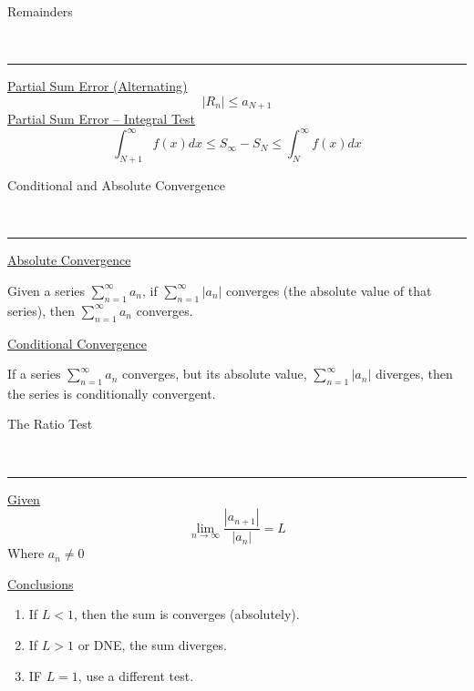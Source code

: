 \documentclass{article}
\begin{document}
\begin{large}
    Remainders
\end{large}\\
\noindent\rule{\textwidth}{0.5pt}

\begin{center}
\begin{multicols}{2}\noindent
    \underline{Partial Sum Error (Alternating)}
    \[
        |R_n| \leq a_{N+1}
    \]
    \vfill\null\columnbreak
    \underline{Partial Sum Error -- Integral Test}\\
    \[
    \int_{N+1}^\infty f(x)dx \leq S_\infty - S_N \leq \int_N^\infty{f(x) dx}
    \]
    
\end{multicols}
\end{center}

\begin{large}
    Conditional and Absolute Convergence
\end{large}\\
\noindent\rule{\textwidth}{0.5pt}
\begin{multicols}{2}
\begin{center}
    \underline{Absolute Convergence}\\
    \medskip
    
    Given a series $\sum_{n = 1}^\infty a_n$, if $\sum_{n = 1}^\infty |a_n|$ converges (the absolute value of that series), then $\sum_{n = 1}^\infty a_n$ converges.\\
    
    \vfill\null\columnbreak
    
    \underline{Conditional Convergence}\\\medskip
    
    If a series $\sum_{n=1}^\infty a_n$ converges, but its absolute value, $\sum_{n = 1}^\infty |a_n|$ diverges, then the series is conditionally convergent.
    
\end{center}
\end{multicols}

\begin{large}
    The Ratio Test
\end{large}\\
\noindent\rule{\textwidth}{0.5pt}

\begin{multicols}{2}
\begin{center}
    \underline{Given}
    \[
        \lim_{n \to \infty}{\frac{|a_{n+1}|}{|a_n|}} = L
    \]
    \footnotesize Where $a_n \neq 0$\normalsize
    
    \vfill\null\columnbreak
    \underline{Conclusions}
     
    \begin{enumerate}
        \item If $L < 1$, then the sum is converges (absolutely).
        \item If $L > 1$ or DNE, the sum diverges.
        \item IF $L = 1$, use a different test.
    \end{enumerate}
\end{center}
\end{multicols}
\end{document}
